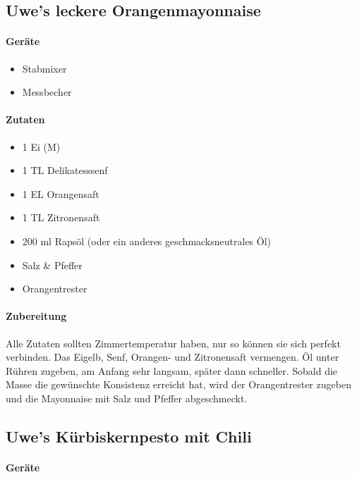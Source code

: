 \subsection{Uwe's leckere Orangenmayonnaise}\label{Orangenmayo}

\paragraph{Geräte}

\begin{itemize}[noitemsep]
	\item Stabmixer
	\item Messbecher
\end{itemize}

\paragraph{Zutaten}

\begin{itemize}[noitemsep]
	\item 1 Ei (M)
	\item 1 TL Delikatesssenf
	\item 1 EL Orangensaft
	\item 1 TL Zitronensaft
	\item 200 ml Rapsöl (oder ein anderes geschmacksneutrales Öl)
	\item Salz \& Pfeffer
	\item Orangentrester
\end{itemize}

\paragraph{Zubereitung}

Alle Zutaten sollten Zimmertemperatur haben, nur so können sie sich perfekt 
verbinden. Das Eigelb, Senf, Orangen- und Zitronensaft vermengen. Öl unter Rühren zugeben, am Anfang sehr langsam, später dann schneller. Sobald die Masse die gewünschte Konsistenz erreicht hat, wird der Orangentrester zugeben und die Mayonnaise mit Salz und Pfeffer abgeschmeckt.

\subsection{Uwe's Kürbiskernpesto mit Chili}

\paragraph{Geräte}

